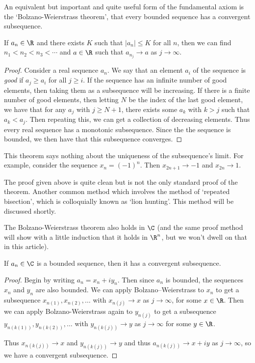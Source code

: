 \documentclass[a4paper]{scrartcl}
\begin{document}
An equivalent but important and quite useful form of the fundamental axiom is the `Bolzano-Weierstrass theorem', that every bounded sequence has a convergent subsequence.

\begin{theorem}\label{thm:bolzano}
	If $a_n \in \R$ and there exists $K$ such that $|a_n| \leq K$ for all $n$, then we can find $n_1 < n_2 < n_3 < \cdots$ and $a \in \R$ such that $a_{n_j} \rightarrow a$ as $j \rightarrow \infty$.
\end{theorem}
\begin{proof}
Consider a real sequence $a_{n}$. We say that an element $a_{i}$ of the sequence is \emph{good} if $a_{j} \geq a_{i}$ for all $j \geq i$. If the sequence has an infinite number of good elements, then taking them as a subsequence will be increasing. If there is a finite number of good elements, then letting $N$ be the index of the last good element, we have that for any $a_{j}$ with $j \geq N+1$, there exists some $a_{k}$ with $k>j$ such that $a_{k}<a_{j}$. Then repeating this, we can get a collection of decreasing elements. Thus every real sequence has a monotonic subsequence.
Since the the sequence is bounded, we then have that this subsequence converges.
\end{proof}

\begin{remark}
	This theorem says nothing about the uniqueness of the subsequence's limit. For example, consider the sequence $x_n = (-1)^n$. Then $x_{2n + 1} \rightarrow -1$ and $x_{2n} \rightarrow 1$.
\end{remark}

The proof given above is quite clean but is not the only standard proof of the theorem. Another common method which involves the method of `repeated bisection', which is colloquially known as `lion hunting'. This method will be discussed shortly. 

The Bolzano-Weierstrass theorem also holds in $\C$ (and the same proof method will show with a little induction that it holds in $\R^n$, but we won't dwell on that in this article). 

\begin{theorem}
	If $a_n \in \C$ is a bounded sequence, then it has a convergent subsequence.
\end{theorem}
\begin{proof}
	Begin by writing $a_n = x_n + i y_n$. Then since $a_n$ is bounded, the sequences $x_n$ and $y_n$ are also bounded.
	We can apply Bolzano–Weierstrass to $x_n$ to get a subsequence $x_{n(1)}, x_{n(2)}, \dots$ with $x_{n(j)} \rightarrow x$ as $j \rightarrow \infty$, for some $x \in \R$.
	Then we can apply Bolzano-Weierstrass again to $y_{n(j)}$ to get a subsequence $y_{n(k(1))}, y_{n(k(2))}, \dots$ with $y_{n(k(j))} \rightarrow y$ as $j \rightarrow \infty$ for some $y \in \R$.

	Thus $x_{n(k(j))} \rightarrow x$ and $y_{n(k(j))} \rightarrow y$ and thus $a_{n(k(j))} \rightarrow x + iy$ as $j \rightarrow \infty$, so we have a convergent subsequence.
\end{proof}
\end{document}
